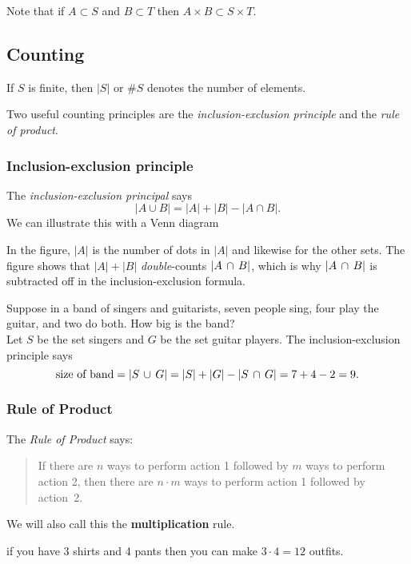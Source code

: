\medskip

Note that if $A \subset S$ and $B \subset T$ then $A \times B \subset S \times T$. 


\subsection{Counting}
If $S$ is finite, then $|S|$ or $\#S$ denotes the number of elements.

Two useful counting principles are the 
\emph{inclusion-exclusion principle} and the \emph{rule of product}.

\subsubsection{Inclusion-exclusion principle} 
The \emph{inclusion-exclusion principal} says 
$$|A \cup B| = |A| + |B| - |A \cap B|.$$
We can illustrate this with a Venn diagram\\

In the figure, $|A|$ is the number of dots in $|A|$ and likewise for the
other sets. The figure shows that $|A| + |B|$ \emph{double}-counts $|A\,\cap\, B|$, which is why $|A\,\cap\, B|$ is subtracted off in the inclusion-exclusion formula.

\medskip

\numexamp Suppose in a band of singers and guitarists, seven people sing, four play the guitar, and two do both.  How big is the band? \\

\ans Let $S$ be the set singers and $G$ be the set guitar players. The inclusion-exclusion
principle says
\[ \text{size of band} = |S\,\cup\, G| = |S| + |G| - |S\,\cap\, G| = 
7 + 4 - 2 = 9.
\]

\subsubsection{Rule of Product}
The {\em Rule of Product} says:
\begin{quotation}
\noindent
If there are $n$ ways to perform action 1 followed by $m$ ways to perform action 2, then there are $n \cdot m$ ways to perform action 1 followed by action~2.
\end{quotation}
We will also call this the \textbf{multiplication} rule.

\medskip

\numexamp if you have 3 shirts and 4 pants then you can make $3 \cdot 4 = 12$ outfits.  

